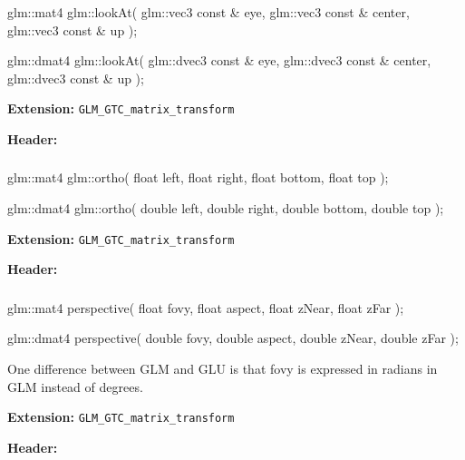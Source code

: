 \documentclass{scrartcl}
\numberwithin{figure}{subsection}
\begin{document}
\subsubsection{}

\begin{cppcode}
glm::mat4 glm::lookAt(
  glm::vec3 const & eye,
  glm::vec3 const & center,
  glm::vec3 const & up
);

glm::dmat4 glm::lookAt(
  glm::dvec3 const & eye,
  glm::dvec3 const & center,
  glm::dvec3 const & up
);
\end{cppcode}

\textbf{Extension:} \verb|GLM_GTC_matrix_transform|

\textbf{Header:} 
 
\subsubsection{}

\begin{cppcode}
glm::mat4 glm::ortho(
  float left, float right, float bottom, float top
);
  
glm::dmat4 glm::ortho(
  double left, double right, double bottom, double top
);
\end{cppcode}

\textbf{Extension:} \verb|GLM_GTC_matrix_transform|

\textbf{Header:} 

\subsubsection{}

\begin{cppcode}
glm::mat4 perspective(
  float fovy, float aspect, float zNear, float zFar
);

glm::dmat4 perspective(
  double fovy, double aspect, double zNear, double zFar
);
\end{cppcode}

One difference between GLM and GLU is that fovy is expressed in radians in GLM  instead of degrees.

\textbf{Extension:} \verb|GLM_GTC_matrix_transform|

\textbf{Header:} 

\subsubsection{}
\end{document}
